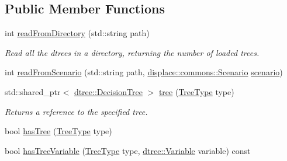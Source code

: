 \subsection*{Public Member Functions}
\begin{DoxyCompactItemize}
\item 
int \mbox{\hyperlink{classdtree_1_1_decision_tree_manager_afffc6c22eead268bef29b980e298dc82}{read\+From\+Directory}} (std\+::string path)
\begin{DoxyCompactList}\small\item\em Read all the dtrees in a directory, returning the number of loaded trees. \end{DoxyCompactList}\item 
int \mbox{\hyperlink{classdtree_1_1_decision_tree_manager_a881d41c8c321734312bb2aa7382de08a}{read\+From\+Scenario}} (std\+::string path, \mbox{\hyperlink{structdisplace_1_1commons_1_1_scenario}{displace\+::commons\+::\+Scenario}} \mbox{\hyperlink{thread__vessels_8cpp_a6c0e7b1e86be7dca81901efbbdd888d7}{scenario}})
\item 
std\+::shared\+\_\+ptr$<$ \mbox{\hyperlink{classdtree_1_1_decision_tree}{dtree\+::\+Decision\+Tree}} $>$ \mbox{\hyperlink{classdtree_1_1_decision_tree_manager_aa1aea06810d8236a5224e7565f4453bc}{tree}} (\mbox{\hyperlink{classdtree_1_1_decision_tree_manager_a14180eb59d2c245ce3af1c27ddb0846d}{Tree\+Type}} type)
\begin{DoxyCompactList}\small\item\em Returns a reference to the specified tree. \end{DoxyCompactList}\item 
bool \mbox{\hyperlink{classdtree_1_1_decision_tree_manager_a85595249e752ebde0b18422b232ff3ab}{has\+Tree}} (\mbox{\hyperlink{classdtree_1_1_decision_tree_manager_a14180eb59d2c245ce3af1c27ddb0846d}{Tree\+Type}} type)
\item 
bool \mbox{\hyperlink{classdtree_1_1_decision_tree_manager_a8429a7681b0a62ec015dcaabff330d29}{has\+Tree\+Variable}} (\mbox{\hyperlink{classdtree_1_1_decision_tree_manager_a14180eb59d2c245ce3af1c27ddb0846d}{Tree\+Type}} type, \mbox{\hyperlink{namespacedtree_a79fe30831a14df904319f9e783b3189b}{dtree\+::\+Variable}} variable) const
\end{DoxyCompactItemize}
